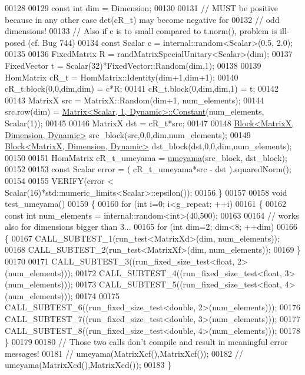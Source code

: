 \begin{DoxyCode}
00128 
00129   \textcolor{keyword}{const} \textcolor{keywordtype}{int} dim = Dimension;
00130 
00131   \textcolor{comment}{// MUST be positive because in any other case det(cR\_t) may become negative for}
00132   \textcolor{comment}{// odd dimensions!}
00133   \textcolor{comment}{// Also if c is to small compared to t.norm(), problem is ill-posed (cf. Bug 744)}
00134   \textcolor{keyword}{const} Scalar c = internal::random<Scalar>(0.5, 2.0);
00135 
00136   FixedMatrix R = randMatrixSpecialUnitary<Scalar>(dim);
00137   FixedVector t = Scalar(32)*FixedVector::Random(dim,1);
00138 
00139   HomMatrix cR\_t = HomMatrix::Identity(dim+1,dim+1);
00140   cR\_t.block(0,0,dim,dim) = c*R;
00141   cR\_t.block(0,dim,dim,1) = t;
00142 
00143   MatrixX src = MatrixX::Random(dim+1, num\_elements);
00144   src.row(dim) = \hyperlink{group___core___module_class_eigen_1_1_matrix}{Matrix<Scalar, 1, Dynamic>::Constant}(num\_elements, 
      Scalar(1));
00145 
00146   MatrixX dst = cR\_t*src;
00147 
00148   \hyperlink{group___core___module_class_eigen_1_1_block}{Block<MatrixX, Dimension, Dynamic>} src\_block(src,0,0,dim,num\_elements);
00149   \hyperlink{group___core___module_class_eigen_1_1_block}{Block<MatrixX, Dimension, Dynamic>} dst\_block(dst,0,0,dim,num\_elements);
00150 
00151   HomMatrix cR\_t\_umeyama = \hyperlink{group___geometry___module_ga033d6550c1fc82e232f2b4c380c19a54}{umeyama}(src\_block, dst\_block);
00152 
00153   \textcolor{keyword}{const} Scalar error = ( cR\_t\_umeyama*src - dst ).squaredNorm();
00154 
00155   VERIFY(error < Scalar(16)*std::numeric\_limits<Scalar>::epsilon());
00156 \}
00157 
00158 \textcolor{keywordtype}{void} test\_umeyama()
00159 \{
00160   \textcolor{keywordflow}{for} (\textcolor{keywordtype}{int} i=0; i<g\_repeat; ++i)
00161   \{
00162     \textcolor{keyword}{const} \textcolor{keywordtype}{int} num\_elements = internal::random<int>(40,500);
00163 
00164     \textcolor{comment}{// works also for dimensions bigger than 3...}
00165     \textcolor{keywordflow}{for} (\textcolor{keywordtype}{int} dim=2; dim<8; ++dim)
00166     \{
00167       CALL\_SUBTEST\_1(run\_test<MatrixXd>(dim, num\_elements));
00168       CALL\_SUBTEST\_2(run\_test<MatrixXf>(dim, num\_elements));
00169     \}
00170 
00171     CALL\_SUBTEST\_3((run\_fixed\_size\_test<float, 2>(num\_elements)));
00172     CALL\_SUBTEST\_4((run\_fixed\_size\_test<float, 3>(num\_elements)));
00173     CALL\_SUBTEST\_5((run\_fixed\_size\_test<float, 4>(num\_elements)));
00174 
00175     CALL\_SUBTEST\_6((run\_fixed\_size\_test<double, 2>(num\_elements)));
00176     CALL\_SUBTEST\_7((run\_fixed\_size\_test<double, 3>(num\_elements)));
00177     CALL\_SUBTEST\_8((run\_fixed\_size\_test<double, 4>(num\_elements)));
00178   \}
00179 
00180   \textcolor{comment}{// Those two calls don't compile and result in meaningful error messages!}
00181   \textcolor{comment}{// umeyama(MatrixXcf(),MatrixXcf());}
00182   \textcolor{comment}{// umeyama(MatrixXcd(),MatrixXcd());}
00183 \}
\end{DoxyCode}
